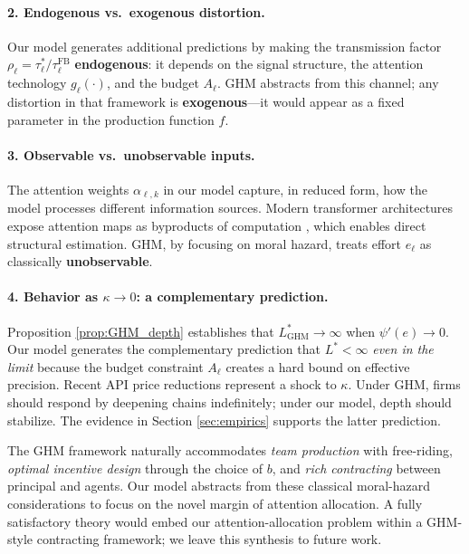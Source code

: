 \paragraph{2. Endogenous vs.~exogenous distortion.} Our model generates additional predictions by making the transmission factor $\rho_\ell = \tau^*_\ell / \tau^{\text{FB}}_\ell$ \textbf{endogenous}: it depends on the signal structure, the attention technology $g_\ell(\cdot)$, and the budget $A_\ell$. GHM abstracts from this channel; any distortion in that framework is \textbf{exogenous}---it would appear as a fixed parameter in the production function $f$.

\paragraph{3. Observable vs.~unobservable inputs.} The attention weights $\alpha_{\ell,k}$ in our model capture, in reduced form, how the model processes different information sources. Modern transformer architectures expose attention maps as byproducts of computation \citep{vaswani2017attention}, which enables direct structural estimation. GHM, by focusing on moral hazard, treats effort $e_\ell$ as classically \textbf{unobservable}.

\paragraph{4. Behavior as $\kappa \to 0$: a complementary prediction.} Proposition \ref{prop:GHM_depth} establishes that $L^*_{\text{GHM}} \to \infty$ when $\psi'(e) \to 0$. Our model generates the complementary prediction that $L^* < \infty$ \emph{even in the limit} because the budget constraint $A_\ell$ creates a hard bound on effective precision. Recent API price reductions represent a shock to $\kappa$. Under GHM, firms should respond by deepening chains indefinitely; under our model, depth should stabilize. The evidence in Section \ref{sec:empirics} supports the latter prediction.

\begin{remark}
The GHM framework naturally accommodates \emph{team production} with free-riding, \emph{optimal incentive design} through the choice of $b$, and \emph{rich contracting} between principal and agents. Our model abstracts from these classical moral-hazard considerations to focus on the novel margin of attention allocation. A fully satisfactory theory would embed our attention-allocation problem within a GHM-style contracting framework; we leave this synthesis to future work.
\end{remark}
